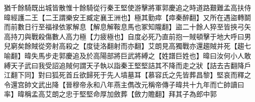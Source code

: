 猶千餘騎既出城皆散惟十餘騎從行秦王堅使游擊將軍郭慶追之時道路艱難孟高扶侍暐經護二王【二王謂樂安王臧定襄王洲也】極其勤瘁【瘁秦醉翻】又所在遇盜轉鬬而前數日行至福禄依冢解息【解息解鞍息馬也冢知隴翻】盜二十餘人猝至皆挾弓矢高持刀與戰殺傷數人高力極【力疲極也】自度必死乃直前抱一賊頓擊于地大呼曰男兒窮矣餘賊從旁射高殺之【度徒洛翻射而亦翻】艾朗見高獨戰亦還趨賊并死【趨七喻翻】暐失馬步走郭慶追及於高陽部將巨武將縛之【姓譜巨姓也】暐曰汝何小人敢縛天子武曰我受詔追賊何謂天子執以詣秦王堅堅詰其不降而走之狀【詰去吉翻降戶江翻下同】對曰狐死首丘欲歸死于先人墳墓耳【慕容氏之先皆葬昌黎】堅哀而釋之令還宫帥文武出降【晉穆帝永和八年燕主儁改元稱帝傳子暐共十九年而亡帥讀曰率】暐稱孟高艾朗之忠于堅堅命厚加斂葬【斂力贍翻】拜其子為郎中郭